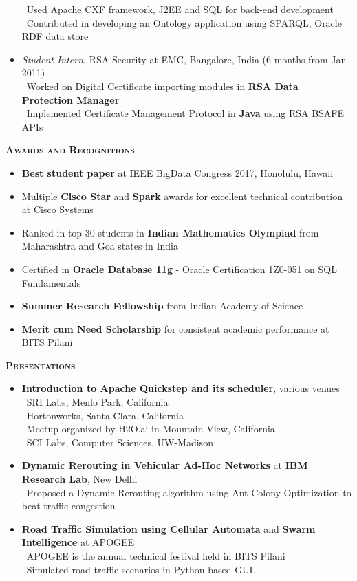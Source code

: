 \documentclass[11pt]{article}
\newcommand{\graybox}[1]{\begin{mdframed}[backgroundcolor=light-gray, linecolor=light-gray, roundcorner=10pt, shadow=false, shadowsize=1pt]
\Large{\textbf{\textsc{#1}}}
\end{mdframed}}
\begin{document}
\begin{itemize}
		\textendash\ Used Apache CXF framework, J2EE and SQL for back-end development\\
		\textendash\ Contributed in developing an Ontology application using SPARQL, Oracle RDF data store\\
	\item{\textit{Student Intern}, RSA Security at EMC, Bangalore, India \hfill (6 months from Jan 2011)}\\
		\textendash\ Worked on Digital Certificate importing modules in \textbf{RSA Data Protection Manager}\\
		\textendash\ Implemented Certificate Management Protocol in \textbf{Java} using RSA BSAFE APIs\\
\end{itemize}
\graybox{Awards and Recognitions}
\begin{itemize}\addtolength{\itemsep}{-0.5\baselineskip}
	\item{\textbf{Best student paper} at IEEE BigData Congress 2017, Honolulu, Hawaii}	
	\item{Multiple \textbf{Cisco Star} and \textbf{Spark} awards for excellent technical contribution at Cisco Systems}
	\item{Ranked in top 30 students in \textbf{Indian Mathematics Olympiad} from Maharashtra and Goa states in India}
	\item{Certified in \textbf{Oracle Database 11g} - Oracle Certification 1Z0-051 on SQL Fundamentals}
	\item{\textbf{Summer Research Fellowship} from Indian Academy of Science}
	\item{\textbf{Merit cum Need Scholarship} for consistent academic performance at BITS Pilani}
\end{itemize}
\graybox{Presentations}
\begin{itemize}\addtolength{\itemsep}{-0.5\baselineskip}
	\item{\textbf{Introduction to Apache Quickstep and its scheduler}, various venues}\\
	\textendash\  SRI Labs, Menlo Park, California\\
	\textendash\  Hortonworks, Santa Clara, California\\
	\textendash\  Meetup organized by H2O.ai in Mountain View, California\\	
	\textendash\  SCI Labs, Computer Sciences, UW-Madison\\		
	\item{\textbf{Dynamic Rerouting in Vehicular Ad-Hoc Networks} at \textbf{IBM Research Lab}, New Delhi}\\
	\textendash\ Proposed a Dynamic Rerouting algorithm using Ant Colony Optimization to beat traffic congestion\\
	\item{\textbf{Road Traffic Simulation using Cellular Automata} and \textbf{Swarm Intelligence} at APOGEE}\\
	\textendash\  APOGEE is the annual technical festival held in BITS Pilani\\
	\textendash\  Simulated road traffic scenarios in Python based GUI.
\end{itemize}
\end{document}
